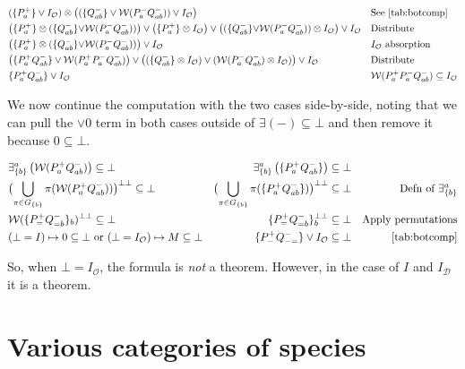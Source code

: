 \documentclass{article}
\theoremstyle{definition}
\newcommand{\cD}{\mathcal{D}}
\newcommand{\cO}{\mathcal{O}}
\newcommand{\cW}{\mathcal{W}}
\begin{document}
\begin{align*}
    &(\{P^+_a\} \vee I_\cO)\otimes \bigl((\{Q^-_{ab}\}\vee \cW(P^-_aQ^-_{ab})) \vee I_\cO\bigr) && \text{See \cref{tab:botcomp}}\\
    &\bigl(\{P^+_a\} \otimes (\{Q^-_{ab}\}{\vee} \cW(P^-_aQ^-_{ab}))\bigr)\vee  \bigl(\{P^+_a\} \otimes I_\cO\bigr) \vee \bigl((\{Q^-_{ab}\}{\vee} \cW(P^-_aQ^-_{ab})) \otimes I_\cO\bigr)\vee I_\cO && \text{Distribute} \\
    &\bigl(\{P^+_a\} \otimes (\{Q^-_{ab}\}{\vee} \cW(P^-_aQ^-_{ab}))\bigr) \vee I_\cO && I_\cO\text{ absorption} \\
    &\bigl(\{P^+_aQ^-_{ab}\} \vee \cW(P^+_aP^-_aQ^-_{ab})\bigr) \vee \bigl((\{Q^-_{ab}\}\otimes I_\cO) \vee (\cW(P^-_aQ^-_{ab}) \otimes I_\cO)\bigr)\vee I_\cO  && \text{Distribute} \\
    &\{P^+_aQ^-_{ab}\}  \vee I_\cO  && \cW(P^+_aP^-_aQ^-_{ab})\subseteq I_\cO\\
\end{align*}

We now continue the computation with the two cases side-by-side, noting that we can pull the $\vee 0$ term in both cases outside of $\exists(-)\subseteq \bot$ and then remove it because $0 \subseteq \bot$.

\begin{align*}
    &\exists_{\{b\}}^a\left(\cW(P^+_aQ^-_{ab})\right) \subseteq \bot & \exists_{\{b\}}^a\left(\{P^+_aQ^-_{ab}\}\right) \subseteq \bot && \\
    &\bigl(\bigcup_{\pi \in G_{\{b\}}} \pi(\cW(P^+_aQ^-_{ab}))\bigr)^{\bot\bot}\subseteq \bot & \bigl(\bigcup_{\pi \in G_{\{b\}}} \pi(\{P^+_aQ^-_{ab}\})\bigr)^{\bot\bot}\subseteq \bot && \text{Defn of }\exists^a_{\{b\}}\\
    &\cW(\{P^+_=Q^-_{=b}\}_b)^{\bot\bot}\subseteq \bot & \{P^+_=Q^-_{=b}\}_b^{\bot\bot}\subseteq \bot && \text{Apply permutations}\\
    &(\bot=I)\mapsto 0\subseteq \bot\text{ or } (\bot=I_\cO)\mapsto M\subseteq \bot & \{P^+_-Q^-_{-=}\}\vee I_\cO \subseteq \bot && \text{\cref{tab:botcomp}}
\end{align*}

So, when $\bot=I_\cO$, the formula is {\it not} a theorem. However, in the case of $I$ and $I_\cD $ it is a theorem.


\section{Various categories of species}
\label{sec:species}
\end{document}
